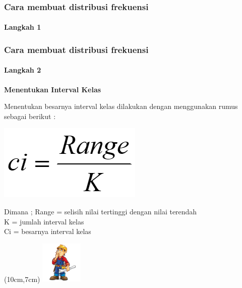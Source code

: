 \documentclass[main.tex]{subfiles}
\begin{document}
\begin{frame}[c]
	\frametitle{Cara membuat distribusi frekuensi}
	\framesubtitle{Langkah 1}
\end{frame}

\begin{frame}[c]
	\frametitle{Cara membuat distribusi frekuensi}
	\framesubtitle{Langkah 2}
	\textbf{Menentukan Interval Kelas}

	Menentukan besarnya interval kelas dilakukan dengan menggunakan rumus sebagai berikut :

	\begin{center}
		\includegraphics[scale=0.5]{figures/disfrek2}
	\end{center}

	{\small
	Dimana ;
	Range = selisih nilai tertinggi dengan nilai terendah\\
	K = jumlah interval kelas\\
	Ci  = besarnya interval kelas}
	\begin{textblock*}{2cm}(10cm,7cm) %
		\includegraphics[width=2cm]{figures/cons}
	\end{textblock*}

\end{frame}
\end{document}
